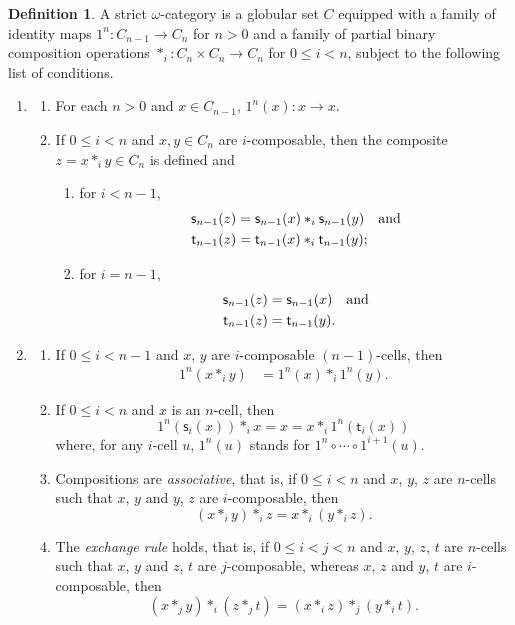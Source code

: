 \documentclass[reqno]{amsart}
\theoremstyle{plain}
\theoremstyle{definition}
\newtheorem{definition}[subsubsection]{Definition}
\theoremstyle{remark}
\newcommand{\source}{\mathsf{s}} %
\newcommand{\target}{\mathsf{t}} %
\newcommand{\unit}[1]{1^{#1}} %
\newcommand{\comp}[1]{\ast_{#1}} %
\newcommand{\sce}[1]{\source_{#1}} %
\newcommand{\tge}[1]{\target_{#1}} %
\newcommand{\oo}{\ensuremath{\omega}}
\begin{document}
\begin{definition}\label{def:oo-cat}
 A strict \oo-category  is a globular set $C$ equipped with a family of identity maps
$\unit n:C_{n-1}\to C_n$ for $n>0$ and a family of partial binary composition operations  $\comp i:C_n\times C_n\to C_n$ for $0\leq i< n$, subject to the following list of conditions. 
\begin{enumerate}
\item
  \begin{enumerate}
  \item For each $n>0$ and $x\in C_{n-1}$, $\unit{n}(x): x\to x$.
  \item If $0\leq i<n$ and $x,y\in C_n$ are $i$-composable, then the composite $z=x\comp i y\in C_n$ is defined and
    \begin{enumerate}
    \item for $i<n-1$,
      \begin{align*}
        \sce{n-1}(z) & =\sce{n-1}(x)\comp i\sce{n-1}(y)\quad \hbox{and}\\
        \tge{n-1}(z) & =\tge{n-1}(x)\comp i\tge{n-1}(y) ;
      \end{align*}
    \item  for $i=n-1$,
      \begin{align*}
        \sce{n-1}(z) & =\sce{n-1}(x) \quad \hbox{and}\\
         \tge{n-1}(z) & =\tge{n-1}(y).
      \end{align*}
    \end{enumerate}
    \end{enumerate}
\item
  \begin{enumerate}
  \item If $0\leq i <n-1$ and $x$, $y$ are $i$-composable $(n{-}1)$-cells, then
    \begin{align*}
      \unit n(x\comp i y) & =\unit n(x)\comp i \unit n(y).
    \end{align*}
  \item If $0\leq i<n$ and $x$ is an $n$-cell, then
    \[\unit n(\sce i(x))\comp i x=x=x\comp i\unit n(\tge i(x))\]
    where, for any $i$-cell $u$, $\unit n(u)$ stands for $\unit n\circ\cdots\circ\unit{i+1}(u)$.
  \item Compositions are {\em associative}, that is, if $0\leq i<n$ and $x$, $y$, $z$ are $n$-cells such that $x$, $y$ and $y$, $z$ are $i$-composable, then
    \[(x\comp i y)\comp i z=x\comp i (y\comp i z).\]
  \item The {\em exchange rule} holds, that is, if $0\leq i<j<n$ and $x$, $y$, $z$, $t$ are $n$-cells such that $x$, $y$ and $z$, $t$ are $j$-composable, whereas $x$, $z$ and $y$, $t$ are $i$-composable, then
    \[(x\comp j y)\comp i (z\comp j t)= (x\comp i z)\comp j (y\comp i t).\]
  \end{enumerate}
\end{enumerate}
\end{definition}
\end{document}
